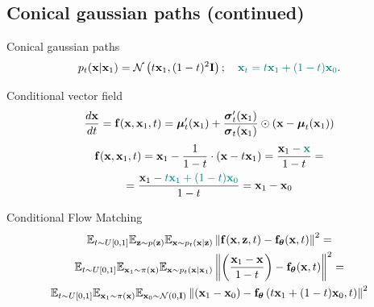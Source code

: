 \subsection{Conical gaussian paths (continued)}
\begin{frame}{Conical gaussian paths}
	\vspace{-0.3cm}
	\[
		p_t(\mathbf{x} | \mathbf{x}_1) = \mathcal{N}\left(t \mathbf{x}_1, (1-t)^2 \mathbf{I}\right); \quad {\color{teal}\mathbf{x}_t = t \mathbf{x}_1 + (1 - t) \mathbf{x}_0}. 
	\]
	\vspace{-0.5cm}
	\begin{block}{Conditional vector field}
		\vspace{-0.3cm}
		\[
			 \frac{d\mathbf{x}}{dt} = \mathbf{f}(\mathbf{x}, \mathbf{x}_1, t) =  \boldsymbol{\mu}_t'(\mathbf{x}_1) + \frac{\boldsymbol{\sigma}_t'(\mathbf{x}_1)}{\boldsymbol{\sigma}_t(\mathbf{x}_1)} \odot (\mathbf{x} - \boldsymbol{\mu}_t(\mathbf{x}_1))
		\]
		\vspace{-0.5cm}
		\begin{multline*}
			\mathbf{f}(\mathbf{x}, \mathbf{x}_1, t) = \mathbf{x}_1 - \frac{1}{1-t} \cdot (\mathbf{x} - t \mathbf{x}_1) = \frac{\mathbf{x}_1 - {\color{teal}\mathbf{x}}}{1-t} = \\
			= \frac{\mathbf{x}_1 - {\color{teal}t \mathbf{x}_1 + (1 - t) \mathbf{x}_0}}{1-t} = \mathbf{x}_1 - \mathbf{x}_0
		\end{multline*}
		\vspace{-0.7cm}
	\end{block}
	\begin{block}{Conditional Flow Matching}
		\vspace{-0.7cm}
		\begin{multline*}
			\mathbb{E}_{t \sim U[0, 1]} \mathbb{E}_{\mathbf{z} \sim p(\mathbf{z})} \mathbb{E}_{\mathbf{x} \sim p_t(\mathbf{x} | \mathbf{z})}\left\| \mathbf{f}(\mathbf{x}, \mathbf{z}, t) - \mathbf{f}_{\boldsymbol{\theta}}(\mathbf{x}, t) \right\|^2 = \\
		 \mathbb{E}_{t \sim U[0, 1]} \mathbb{E}_{\mathbf{x}_1 \sim \pi(\mathbf{x})} \mathbb{E}_{\mathbf{x} \sim p_t(\mathbf{x} | \mathbf{x}_1)}\left\| \left(\frac{\mathbf{x}_1 - \mathbf{x}}{1-t}\right) - \mathbf{f}_{\boldsymbol{\theta}}(\mathbf{x}, t) \right\|^2 = \\
		 \mathbb{E}_{t \sim U[0, 1]} \mathbb{E}_{\mathbf{x}_1 \sim \pi(\mathbf{x})} \mathbb{E}_{\mathbf{x}_0 \sim \mathcal{N}(0, \mathbf{I})}\left\| (\mathbf{x}_1 - \mathbf{x}_0) - \mathbf{f}_{\boldsymbol{\theta}}\left(t \mathbf{x}_1 + (1 - t) \mathbf{x}_0, t\right) \right\|^2
		\end{multline*}
		\vspace{-0.5cm}
	\end{block}	
\end{frame}
